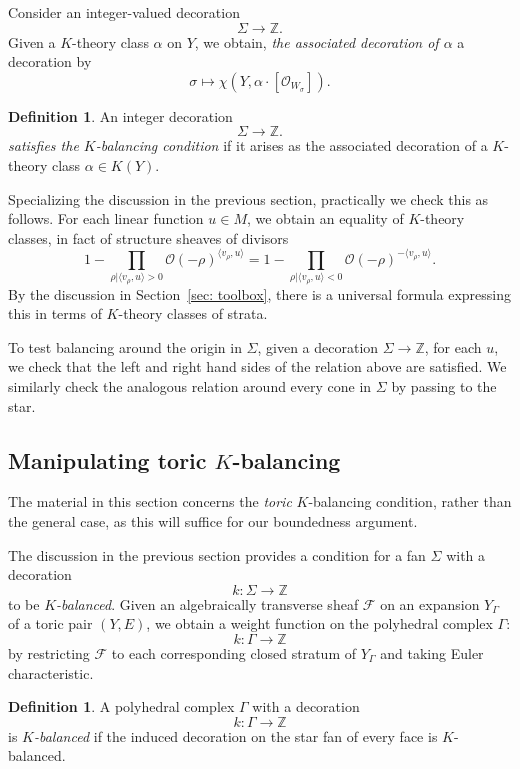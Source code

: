 \documentclass[11pt]{amsart}
\theoremstyle{definition}
\theoremstyle{definition}
\newtheorem{definition}[theorem]{Definition}
\begin{document}
Consider an integer-valued decoration
\[
\Sigma\to \mathbb Z.
\]
Given a $K$-theory class $\alpha$ on $Y$, we obtain, {\it the associated decoration of $\alpha$} a decoration by
\[
\sigma\mapsto \chi(Y,\alpha\cdot[\mathcal O_{W_\sigma}]). 
\]

\begin{definition}
An integer decoration
\[
\Sigma\to \mathbb Z.
\]
{\it satisfies the $K$-balancing condition} if it arises as the associated decoration of a $K$-theory class $\alpha\in K(Y)$. 
\end{definition}

Specializing the discussion in the previous section, practically we check this as follows. For each linear function $u\in M$, we obtain an equality of $K$-theory classes, in fact of structure sheaves of divisors
\[
1-\prod_{\rho|\langle v_\rho,u\rangle>0} \mathcal O(-\rho)^{\langle v_\rho,u\rangle} = 1-\prod_{\rho|\langle v_\rho,u\rangle<0} \mathcal O(-\rho)^{-\langle v_\rho,u\rangle}.
\]
By the discussion in Section~\ref{sec: toolbox}, there is a universal formula expressing this in terms of $K$-theory classes of strata. 

To test balancing around the origin in $\Sigma$, given a decoration $\Sigma\to \mathbb Z$, for each $u$, we check that the left and right hand sides of the relation above are satisfied. We similarly check the analogous relation around every cone in $\Sigma$ by passing to the star. 

\subsection{Manipulating toric $K$-balancing} The material in this section concerns the {\it toric} $K$-balancing condition, rather than the general case, as this will suffice for our boundedness argument. 

The discussion in the previous section provides a condition for a fan $\Sigma$ with a decoration
\[
k\colon \Sigma\to \mathbb Z
\]
to be {\it $K$-balanced}. Given an algebraically transverse sheaf $\mathcal F$ on an expansion $Y_\Gamma$ of a toric pair $(Y,E)$, we obtain a weight function on the polyhedral complex $\Gamma$:
\[
k\colon \Gamma\to \mathbb Z
\]
by restricting $\mathcal F$ to each corresponding closed stratum of $Y_\Gamma$ and taking Euler characteristic. 

\begin{definition}
A polyhedral complex $\Gamma$ with a decoration
\[
k\colon \Gamma\to\mathbb Z
\]
is {\it $K$-balanced} if the induced decoration on the star fan of every face is $K$-balanced. 
\end{definition}
\end{document}

